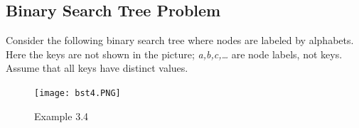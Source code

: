 \documentclass[11pt,fleqn]{book}
\begin{document}
\subsection{Binary Search Tree Problem}
\vspace{1em}
\begin{example}
Consider the following binary search tree where nodes are labeled by alphabets. Here the keys are not shown in the picture; \textit{a,b,c,\dots} are node labels, not keys. Assume that all keys have distinct values. \\
\begin{figure}[h!]
    \centering
    \texttt{[image: bst4.PNG]}
    \caption{Example 3.4}
    \label{fig:my_label}
\end{figure}
\end{example}
\vspace{1em}
\end{document}
